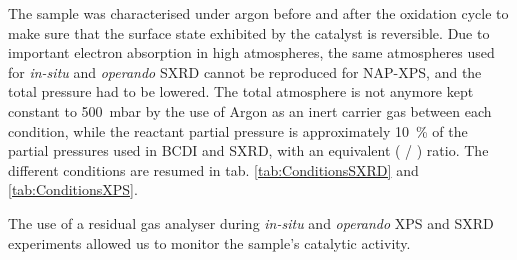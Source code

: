 The sample was characterised under argon before and after the oxidation cycle to make sure that the surface state exhibited by the catalyst is reversible.
Due to important electron absorption in high atmospheres, the same atmospheres used for \textit{in-situ} and \textit{operando} SXRD cannot be reproduced for NAP-XPS, and the total pressure had to be lowered.
The total atmosphere is not anymore kept constant to \qty{500}{\milli\bar} by the use of Argon as an inert carrier gas between each condition, while the reactant partial pressure is approximately \qty{10}{\percent} of the partial pressures used in BCDI and SXRD, with an equivalent ( / ) ratio.
The different conditions are resumed in tab. \ref{tab:ConditionsSXRD} and \ref{tab:ConditionsXPS}.

The use of a residual gas analyser during \textit{in-situ} and \textit{operando} XPS and SXRD experiments allowed us to monitor the sample's catalytic activity.

\begin{table}[!htb]
\centering
{}
\caption{Different atmospheres used to probe the ammonia oxidation on Pt (100) and Pt (111) single crystals with SXRD.}
\label{tab:ConditionsSXRD}
\end{table}

